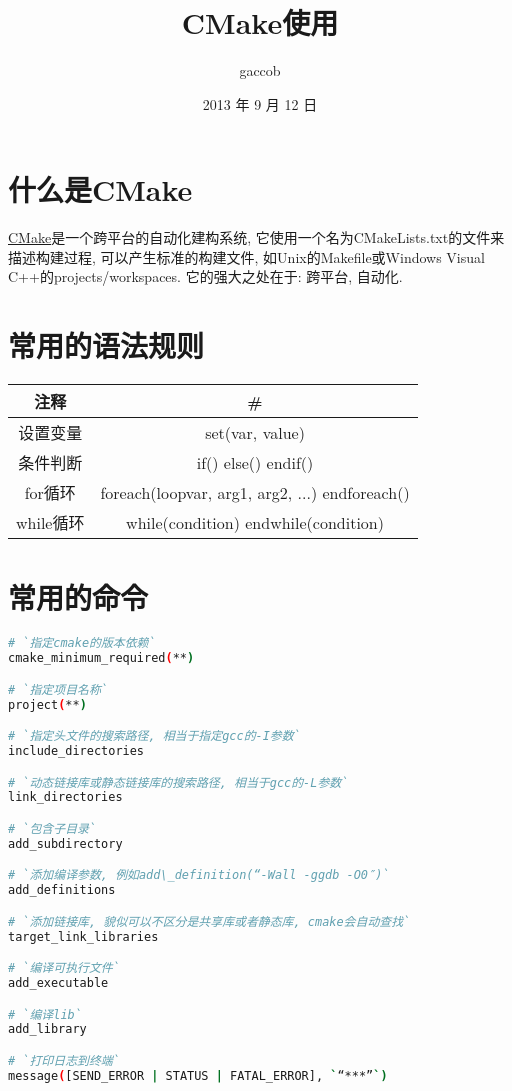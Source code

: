 
\title {\ZHH \huge CMake使用}
\author {\small gaccob}
\date {\small 2013 年 9 月 12 日}
\maketitle

\section{\ZHH 什么是CMake}{
{\href{http://www.cmake.org/cmake/help/v2.8.11/cmake.html}{CMake}是一个跨平台的自动化建构系统, 它使用一个名为CMakeLists.txt的文件来描述构建过程, 可以产生标准的构建文件, 如Unix的Makefile或Windows Visual C++的projects/workspaces. 它的强大之处在于: 跨平台, 自动化. }\par
}

\section{\ZHH 常用的语法规则}{
\begin {table} [htbp]
\centering
\begin {tabular} {| c | c |}
    \hline
    注释        &   \#   \\
    \hline
    设置变量    &   set(var, value) \\
    \hline
    条件判断    &   if() else() endif() \\
    \hline
    for循环     &   foreach(loopvar, arg1, arg2, ...) endforeach() \\
    \hline
    while循环   &   while(condition) endwhile(condition)\\
    \hline
\end {tabular}
\end {table}
}

\section{\ZHH 常用的命令}{
\begin{lstlisting}[language=bash]
# `指定cmake的版本依赖`
cmake_minimum_required(**)

# `指定项目名称`
project(**)

# `指定头文件的搜索路径, 相当于指定gcc的-I参数`
include_directories

# `动态链接库或静态链接库的搜索路径, 相当于gcc的-L参数`
link_directories

# `包含子目录`
add_subdirectory

# `添加编译参数, 例如add\_definition(“-Wall -ggdb -O0″)`
add_definitions

# `添加链接库, 貌似可以不区分是共享库或者静态库, cmake会自动查找`
target_link_libraries

# `编译可执行文件`
add_executable

# `编译lib`
add_library

# `打印日志到终端`
message([SEND_ERROR | STATUS | FATAL_ERROR], `“***”`)
\end{lstlisting}
}

